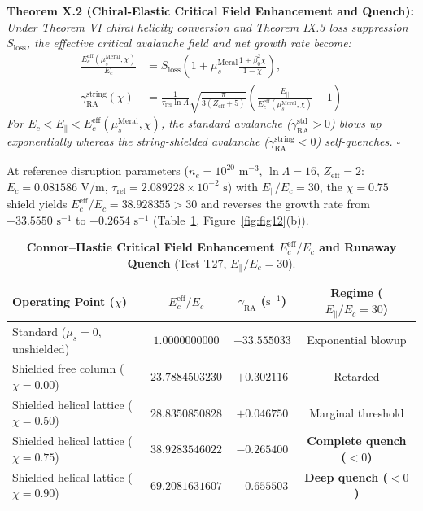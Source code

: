 \documentclass[12pt,a4paper]{article}
\begin{document}
\textbf{Theorem X.2 (Chiral-Elastic Critical Field Enhancement and Quench):} \textit{Under Theorem VI chiral helicity conversion and Theorem IX.3 loss suppression $S_{\mathrm{loss}}$, the effective critical avalanche field and net growth rate become:}
\begin{equation}
\begin{split}
\frac{E_c^{\mathrm{eff}}(\mu_s^{\mathrm{Meral}},\chi)}{E_c}
&= S_{\mathrm{loss}}\left(1 + \mu_s^{\mathrm{Meral}}\frac{1+\beta_0^2\chi}{1-\chi}\right), \\
\gamma_{\mathrm{RA}}^{\mathrm{string}}(\chi)
&= \frac{1}{\tau_{\mathrm{rel}}\ln\Lambda}\sqrt{\frac{\pi}{3(Z_{\mathrm{eff}}+5)}}
\left(\frac{E_\parallel}{E_c^{\mathrm{eff}}(\mu_s^{\mathrm{Meral}},\chi)} - 1\right)
\end{split}
\label{eq:t27_ec}
\end{equation}
\textit{For $E_c < E_\parallel < E_c^{\mathrm{eff}}(\mu_s^{\mathrm{Meral}},\chi)$, the standard avalanche ($\gamma_{\mathrm{RA}}^{\mathrm{std}} > 0$) blows up exponentially whereas the string-shielded avalanche ($\gamma_{\mathrm{RA}}^{\mathrm{string}} < 0$) self-quenches. $\square$}

At reference disruption parameters ($n_e=10^{20}\text{ m}^{-3}$, $\ln\Lambda=16$, $Z_{\mathrm{eff}}=2$: $E_c=0.081586\text{ V/m}$, $\tau_{\mathrm{rel}}=2.089228\times 10^{-2}\text{ s}$) with $E_\parallel/E_c = 30$, the $\chi=0.75$ shield yields $E_c^{\mathrm{eff}}/E_c = 38.928355 > 30$ and reverses the growth rate from $+33.5550\text{ s}^{-1}$ to $-0.2654\text{ s}^{-1}$ (Table~\ref{tab:t27}, Figure~\ref{fig:fig12}(b)).

\begin{table}[!htbp]
\centering
\footnotesize
\setlength{\tabcolsep}{2pt}
\caption{\textbf{Connor--Hastie Critical Field Enhancement $E_c^{\mathrm{eff}}/E_c$ and Runaway Quench} (Test T27, $E_\parallel/E_c=30$).}
\label{tab:t27}
\vspace{0.1cm}
\begin{tabular}{@{}l|c|c|c@{}}
\hline
\textbf{Operating Point ($\chi$)} & \textbf{$E_c^{\mathrm{eff}}/E_c$} & \textbf{$\gamma_{\mathrm{RA}}$ ($\text{s}^{-1}$)} & \textbf{Regime ($E_\parallel/E_c=30$)} \\
\hline
Standard ($\mu_s = 0$, unshielded) & $1.0000000000$ & $+33.555033$ & Exponential blowup \\
Shielded free column ($\chi = 0.00$) & $23.7884503230$ & $+0.302116$ & Retarded \\
Shielded helical lattice ($\chi = 0.50$) & $28.8350850828$ & $+0.046750$ & Marginal threshold \\
Shielded helical lattice ($\chi = 0.75$) & $38.9283546022$ & $-0.265400$ & \textbf{Complete quench ($<0$)} \\
Shielded helical lattice ($\chi = 0.90$) & $69.2081631607$ & $-0.655503$ & \textbf{Deep quench ($<0$)} \\
\hline
\end{tabular}
\end{table}
\end{document}

